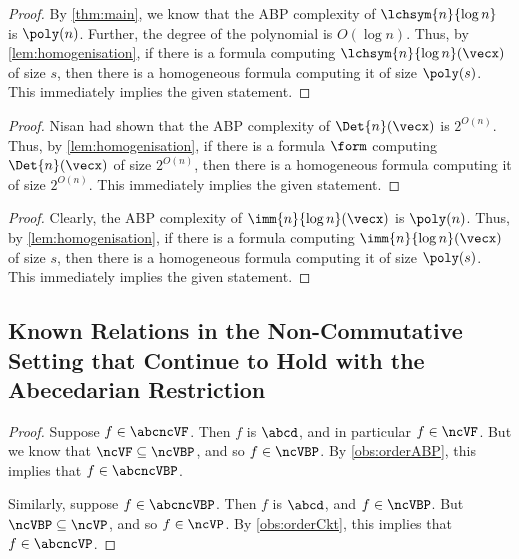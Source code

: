 \FormLBfromHomFormLB*

\begin{proof}
	By \autoref{thm:main}, we know that the ABP complexity of $\lchsym{n}{\log n}$ is $\poly(n)$.
	Further, the degree of the polynomial is $O(\log n)$.
	Thus, by \autoref{lem:homogenisation}, if there is a formula computing $\lchsym{n}{\log n}(\vecx)$ of size $s$, then there is a homogeneous formula computing it of size $\poly(s)$.
	This immediately implies the given statement.
\end{proof}

\FormLBfromHomDetLB*

\begin{proof}
	Nisan \cite{N91} had shown that the ABP complexity of $\Det{n}(\vecx)$ is $2^{O(n)}$. 
	Thus, by \autoref{lem:homogenisation}, if there is a formula $\form$ computing $\Det{n}(\vecx)$ of size $2^{O(n)}$, then there is a homogeneous formula computing it of size $2^{O(n)}$.
	This immediately implies the given statement.
\end{proof}

\FormLBfromHomImmLB*

\begin{proof}
	Clearly, the ABP complexity of $\imm{n}{\log n}(\vecx)$ is $\poly(n)$.
	Thus, by \autoref{lem:homogenisation}, if there is a formula computing $\imm{n}{\log n}(\vecx)$ of size $s$, then there is a homogeneous formula computing it of size $\poly(s)$.
	This immediately implies the given statement.
\end{proof}

\subsection{Known Relations in the Non-Commutative Setting that Continue to Hold with the Abecedarian Restriction}

\usualInclusions*

\begin{proof}
	Suppose $f \in \abcncVF$. 
	Then $f$ is $\abcd$, and in particular $f \in \ncVF$.
	But we know that $\ncVF \subseteq \ncVBP$, and so $f \in \ncVBP$.
	By \autoref{obs:orderABP}, this implies that $f \in \abcncVBP$.

	Similarly, suppose $f \in \abcncVBP$. 
	Then $f$ is $\abcd$, and $f \in \ncVBP$.
	But $\ncVBP \subseteq \ncVP$, and so $f \in \ncVP$.
	By \autoref{obs:orderCkt}, this implies that $f \in \abcncVP$.
\end{proof}

